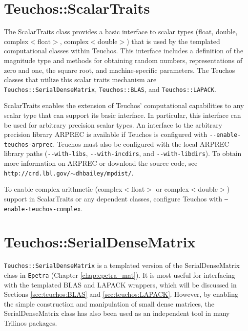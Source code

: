 
\section{Teuchos::ScalarTraits}
\label{sec:teuchos:ScalarTraits}

The ScalarTraits class provides a basic interface to scalar types (float, double, 
complex$<$float$>$, complex$<$double$>$) that is used by the templated 
computational classes within Teuchos.  This interface includes a definition of
the magnitude type and methods for obtaining random numbers, representations of 
zero and one, the square root, and machine-specific parameters.  
The Teuchos classes that utilize this scalar traits mechanism are 
\verb!Teuchos::SerialDenseMatrix!, \verb!Teuchos::BLAS!, and \verb!Teuchos::LAPACK!.  

ScalarTraits enables the extension of Teuchos' computational
capabilities to any scalar type that can support its basic interface.  In particular, 
this interface can be used for arbitrary precision scalar types.  An interface to the
arbitrary precision library ARPREC \cite{arprec:02} is available if Teuchos
is configured with \verb!--enable-teuchos-arprec!. Teuchos must also be configured
with the local ARPREC library paths (\verb!--with-libs!, \verb!--with-incdirs!, and 
\verb!--with-libdirs!).  To obtain more information on ARPREC or download the 
source code, see {\tt http://crd.lbl.gov/$\sim$dhbailey/mpdist/}.

\begin{remark} To enable complex arithmetic (complex$<$float$>$ or complex$<$double$>$) 
support in ScalarTraits or any dependent classes, configure Teuchos with {\tt --enable-teuchos-complex}.
\end{remark}


\section{Teuchos::SerialDenseMatrix}
\label{sec:teuchos:SDM}

\verb!Teuchos::SerialDenseMatrix! is a templated version of the SerialDenseMatrix class in \verb!Epetra!
(Chapter \ref{chap:epetra_mat}).  It is most useful for interfacing with the templated BLAS and 
LAPACK wrappers, which will be discussed in Sections \ref{sec:teuchos:BLAS} and \ref{sec:teuchos:LAPACK}.  
However, by enabling the simple construction and manipulation of small dense matrices, 
the SerialDenseMatrix class has also been used as an independent tool in many 
Trilinos packages.

